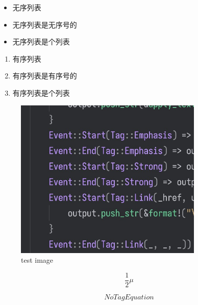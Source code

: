 \begin{itemize}
\item 无序列表
\item 无序列表是无序号的
\item 无序列表是个列表
\end{itemize}
\begin{enumerate}
\item 有序列表
\item 有序列表是有序号的
\item 有序列表是个列表
\end{enumerate}
\begin{figure}[h]
\centering
\includegraphics[width=0.8\textwidth]{images/test.jpg}
\caption{test image}
\label{fig:images/test.jpg}
\end{figure}


\begin{equation}
\label{eq:hhhhh}
\frac{1}{2}\mu
\end{equation}

\begin{equation}
NoTagEquation
\end{equation}

